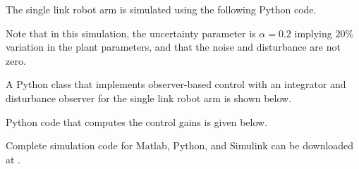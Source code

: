 The single link robot arm is simulated using the following Python code.

Note that in this simulation, the uncertainty parameter is $\alpha=0.2$ implying $20\%$ variation in the plant parameters, and that the noise and disturbance are not zero.

A Python class that implements observer-based control with an integrator and disturbance observer for the single link robot arm is shown below.


Python code that computes the control gains is given below.


Complete simulation code for Matlab, Python, and Simulink can be downloaded at .
